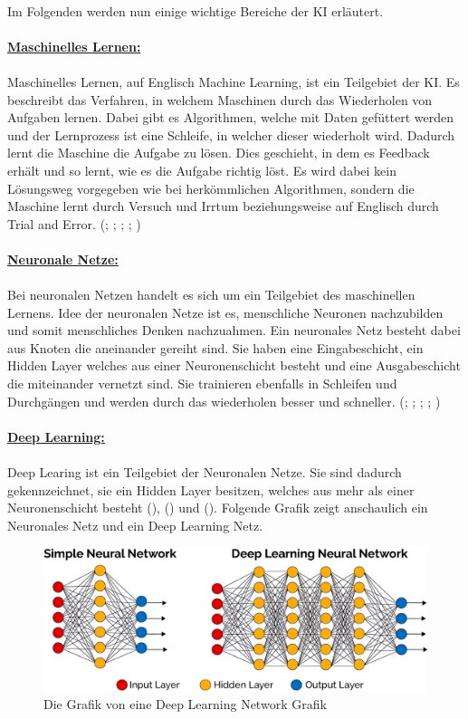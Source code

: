 \documentclass[12pt,toc=bib,toc=listof]{scrreprt}
\begin{document}
\\
Im Folgenden werden nun einige wichtige Bereiche der KI erläutert.\\
\\
\textbf{\underline{Maschinelles Lernen:}}\\
\\
Maschinelles Lernen, auf Englisch Machine Learning, ist ein Teilgebiet der KI. Es beschreibt das Verfahren, in welchem Maschinen durch das Wiederholen von Aufgaben lernen. Dabei gibt es Algorithmen, welche mit Daten gefüttert werden und der Lernprozess ist eine Schleife, in welcher dieser wiederholt wird. Dadurch lernt die Maschine die Aufgabe zu lösen. Dies geschieht, in dem es Feedback erhält und so lernt, wie es die Aufgabe richtig löst. Es wird dabei kein Lösungsweg vorgegeben wie bei herkömmlichen Algorithmen, sondern die Maschine lernt durch Versuch und Irrtum beziehungsweise auf Englisch durch Trial and Error. (\cite{Bhatt2021}; \cite{Hecker2018}; \cite{Mocko2021}; \cite{Roscher2025}; \cite{Zhu2021})\\
\\
\textbf{\underline{Neuronale Netze:}}\\
\\
Bei neuronalen Netzen handelt es sich um ein Teilgebiet des maschinellen Lernens. Idee der neuronalen Netze ist es, menschliche Neuronen nachzubilden und somit menschliches Denken nachzuahmen. Ein neuronales Netz besteht dabei aus Knoten die aneinander gereiht sind. Sie haben eine Eingabeschicht, ein Hidden Layer welches aus einer Neuronenschicht besteht und eine Ausgabeschicht die miteinander vernetzt sind. Sie trainieren ebenfalls in Schleifen und Durchgängen und werden durch das wiederholen besser und schneller. (\cite{Bhatt2021}; \cite{Hecker2018}; \cite{Mocko2021}; \cite{Roscher2025}; \cite{Zhu2021})\\
\\
\textbf{\underline{Deep Learning:}}\\
\\
Deep Learing ist ein Teilgebiet der Neuronalen Netze. Sie sind dadurch gekennzeichnet, sie ein Hidden Layer besitzen, welches aus mehr als einer Neuronenschicht besteht (\cite{Bhatt2021}), (\cite{Dymatrix2018}) und (\cite{Zhu2021}). Folgende Grafik zeigt anschaulich ein Neuronales Netz und ein Deep Learning Netz.
\begin{figure} [H]
    \centering
    \includegraphics[width=0.75\linewidth]{./Bilder/Dymatrix_Deep_Learning_Networks.jpeg}
    \caption{Die Grafik von \textcite{Dymatrix2018} eine Deep Learning Network Grafik}
    \label{fig:enter-label}
\end{figure}
\end{document}
